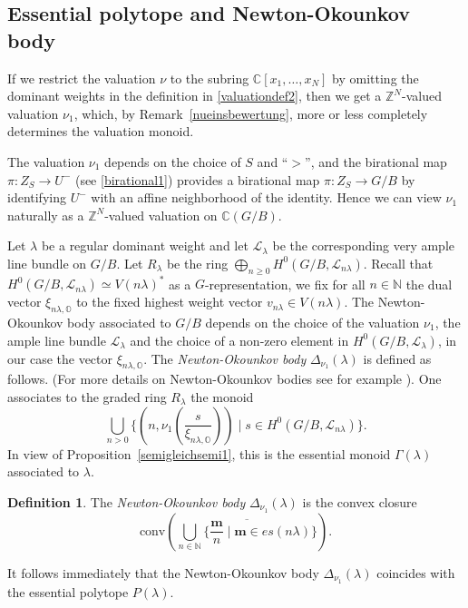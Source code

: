 \documentclass{emsprocart}
\theoremstyle{definition}
\newtheorem{definition}[theorem]{Definition}
\begin{document}
\subsection{Essential polytope and Newton-Okounkov body}\label{NObody}
If we restrict the valuation $\nu$ to the subring $\mathbb C[x_1,\ldots,x_N]$
by omitting the dominant weights in the definition in \eqref{valuationdef2},
then we get a $\mathbb Z^N$-valued valuation $\nu_1$, which, by Remark~\ref{nueinsbewertung},
more or less completely determines the valuation monoid.

The valuation $\nu_1$ depends on the choice of $S$  and ``$>$'', and the birational map
$\pi:Z_S\rightarrow U^-$ (see \eqref{birational1}) provides a birational map $\pi:Z_S\rightarrow G/B$ by identifying $U^-$ with an affine neighborhood
of the identity. Hence we can view $\nu_1$ naturally as a $\mathbb Z^N$-valued valuation on $\mathbb C(G/B)$.

Let $\lambda$ be a regular dominant weight and let $\mathcal L_\lambda$
be the corresponding very ample line bundle on $G/B$. Let $R_\lambda$ be the ring $\bigoplus_{n\ge 0} H^0(G/B,\mathcal L_{n\lambda})$.
Recall that $H^0(G/B,\mathcal L_{n\lambda})\simeq V(n\lambda)^*$ as a $G$-representation, we fix for all $n\in\mathbb N$ the
dual vector $\xi_{n\lambda,\mathbb O}$ to the fixed highest weight vector $v_{n\lambda}\in V(n\lambda)$. The  Newton-Okounkov body
associated to $G/B$ depends on the choice of the valuation $\nu_1$, the ample line bundle $\mathcal L_\lambda$ and the
choice of a non-zero element in $H^0(G/B,\mathcal L_{\lambda})$, in our case the vector $\xi_{n\lambda,\mathbb O}$.
The {\it Newton-Okounkov body} $\Delta_{\nu_1}(\lambda)$ is defined as follows.
(For more details on Newton-Okounkov bodies see for example \cite{KK,K1}). One associates to the graded ring $R_\lambda$ the monoid
$$
\bigcup_{n>0}\{(n,\nu_1(\frac{s}{\xi_{n\lambda,\mathbb O}})) \mid s\in H^0(G/B,\mathcal L_{n\lambda})\}.
$$
In view of Proposition~\ref{semigleichsemi1}, this is the essential monoid $\Gamma(\lambda)$ associated to $\lambda$.
\begin{definition}\label{Def:NOBody}
The {\it Newton-Okounkov body} $\Delta_{\nu_1}(\lambda)$ is the convex closure
$$
\textrm{conv}(\overline{\bigcup_{n\in \mathbb N}\{\frac{\mathbf m}{n}\mid   \mathbf m\in es(n\lambda)\}}).
$$
\end{definition}
It follows immediately that the Newton-Okounkov body $\Delta_{\nu_1}(\lambda)$ coincides with the essential polytope $P(\lambda)$.
\end{document}
